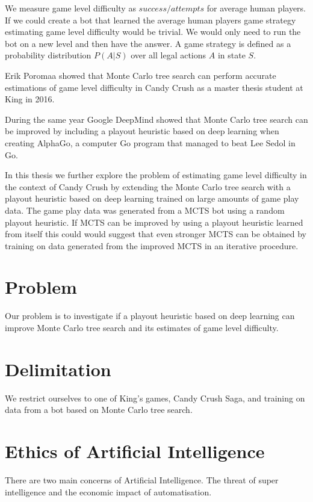 \documentclass{kththesis}
\begin{document}
We measure game level difficulty as $success/attempts$ for average human players. If we could create a bot that learned the average human players game strategy estimating game level difficulty would be trivial.  We would only need to run the bot on a new level and then have the answer. A game strategy  is defined as a probability distribution $P(A|S)$ over all legal actions $A$ in state $S$.

Erik Poromaa showed that Monte Carlo tree search can perform  accurate estimations of game  level difficulty in Candy Crush as a master thesis student at King  in 2016.

During the same year Google DeepMind showed that Monte Carlo tree search can be improved by including a playout heuristic based on deep learning when creating AlphaGo, a computer Go program  that managed to beat  Lee Sedol in Go.

In this thesis we further explore the problem of estimating game level difficulty in the context of Candy Crush by extending the Monte Carlo tree search with a playout heuristic based on deep learning trained on large amounts of game play data. The game play data was generated from a MCTS bot using a random playout heuristic. If MCTS can be improved by using a playout heuristic learned from itself this could  would suggest that even stronger MCTS can be obtained by training on data generated from the improved MCTS in an iterative procedure. 

\section{Problem}
Our problem is to investigate  if a playout heuristic based on deep learning can improve Monte Carlo tree search and its estimates of game level difficulty.

\section{Delimitation}
We restrict ourselves to one of King's games, Candy Crush Saga, and training on data from a bot based on Monte Carlo tree search. 

\section{Ethics of Artificial Intelligence}
There are two main concerns of Artificial Intelligence. The threat of super intelligence and the economic impact of automatisation.
\end{document}
